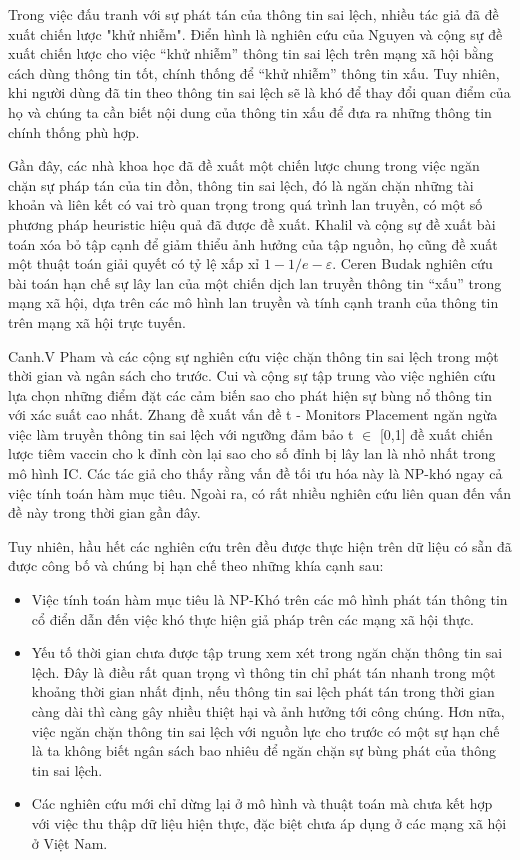 Trong việc đấu tranh với sự phát tán của thông tin sai lệch, nhiều tác giả đã đề xuất chiến lược "khử nhiễm". Điển hình là nghiên cứu của Nguyen và cộng sự \cite{nguyen9} đề xuất chiến lược cho việc “khử nhiễm” thông tin sai lệch trên mạng xã hội bằng cách dùng thông tin tốt, chính thống để “khử nhiễm” thông tin xấu. Tuy nhiên, khi người dùng đã tin theo thông tin sai lệch sẽ là khó để thay đổi quan điểm của họ và chúng ta cần biết nội dung của thông tin xấu để đưa ra những thông tin chính thống phù hợp.

Gần đây, các nhà khoa học đã đề xuất một chiến lược chung trong việc ngăn chặn sự pháp tán của tin đồn, thông tin sai lệch, đó là ngăn chặn những tài khoản và liên kết có vai trò quan trọng trong quá trình lan truyền, có một số phương pháp heuristic hiệu quả đã được đề xuất. Khalil \cite{khalil} và cộng sự đề xuất bài toán xóa bỏ tập cạnh để giảm thiểu ảnh hưởng của tập nguồn, họ cũng đề xuất một thuật toán giải quyết có tỷ lệ xấp xỉ $1 - 1/e - \varepsilon$. Ceren Budak \cite{budak} nghiên cứu bài toán hạn chế sự lây lan của một chiến dịch lan truyền thông tin “xấu”  trong mạng xã hội, dựa trên các mô hình lan truyền và tính cạnh tranh của thông tin trên mạng xã hội trực tuyến. 

Canh.V Pham \cite{cvpham} và các cộng sự nghiên cứu việc chặn thông tin sai lệch trong một thời gian và ngân sách cho trước. Cui \cite{cui} và cộng sự tập trung vào việc nghiên cứu lựa chọn những điểm đặt các cảm biến sao cho phát hiện sự bùng nổ thông tin với xác suất cao nhất. Zhang đề xuất vấn đề t - Monitors Placement  ngăn ngừa việc làm truyền thông tin sai lệch với ngưỡng đảm bảo t $\in$ [0,1] đề xuất chiến lược tiêm vaccin cho k đỉnh còn lại sao cho số đỉnh bị lây lan là nhỏ nhất trong mô hình IC. Các tác giả cho thấy rằng vấn đề tối ưu hóa này là NP-khó ngay cả việc tính toán hàm mục tiêu. Ngoài ra, có rất nhiều nghiên cứu liên quan đến vấn đề này trong thời gian gần đây.

Tuy nhiên, hầu hết các nghiên cứu trên đều được thực hiện trên dữ liệu có sẵn đã được công bố và chúng bị hạn chế theo những khía cạnh sau:
\begin {itemize}
	\item Việc tính toán hàm mục tiêu là NP-Khó trên các mô hình phát tán thông tin cổ điển dẫn đến việc khó thực hiện giả pháp trên các mạng xã hội thực.
	
	\item Yếu tố thời gian chưa được tập trung xem xét trong ngăn chặn thông tin sai lệch. Đây là điều rất quan trọng vì thông tin chỉ phát tán nhanh trong một khoảng thời gian nhất định, nếu thông tin sai lệch phát tán trong thời gian càng dài thì càng gây nhiều thiệt hại và ảnh hưởng tới công chúng. Hơn nữa, việc ngăn chặn thông tin sai lệch với nguồn lực cho trước có một sự hạn chế là ta không biết ngân sách bao nhiêu để ngăn chặn sự bùng phát của thông tin sai lệch.
	
	\item Các nghiên cứu mới chỉ dừng lại ở mô hình và thuật toán mà chưa kết hợp với việc thu thập dữ liệu hiện thực, đặc biệt chưa áp dụng ở các mạng xã hội ở Việt Nam.
\end {itemize}

